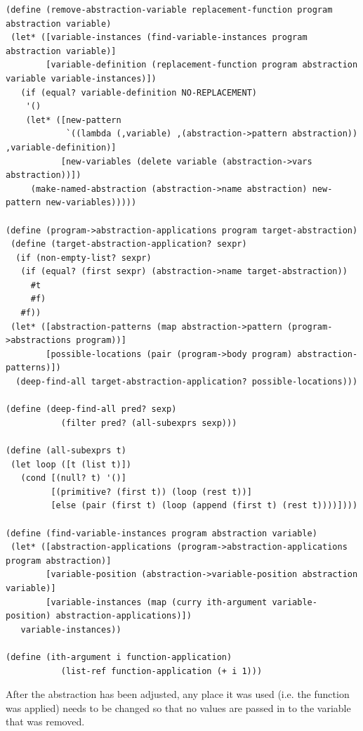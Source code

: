 \documentclass[a4paper,10pt]{article}
\begin{document}
\begin{lstlisting}[frame=trBL]
(define (remove-abstraction-variable replacement-function program abstraction variable)
 (let* ([variable-instances (find-variable-instances program abstraction variable)]
        [variable-definition (replacement-function program abstraction variable variable-instances)])
   (if (equal? variable-definition NO-REPLACEMENT)
    '()
    (let* ([new-pattern 
            `((lambda (,variable) ,(abstraction->pattern abstraction)) ,variable-definition)]
           [new-variables (delete variable (abstraction->vars abstraction))])
     (make-named-abstraction (abstraction->name abstraction) new-pattern new-variables)))))

(define (program->abstraction-applications program target-abstraction)
 (define (target-abstraction-application? sexpr)
  (if (non-empty-list? sexpr)
   (if (equal? (first sexpr) (abstraction->name target-abstraction))
     #t
     #f)
   #f))
 (let* ([abstraction-patterns (map abstraction->pattern (program->abstractions program))]
        [possible-locations (pair (program->body program) abstraction-patterns)])
  (deep-find-all target-abstraction-application? possible-locations)))

(define (deep-find-all pred? sexp)
           (filter pred? (all-subexprs sexp)))

(define (all-subexprs t)
 (let loop ([t (list t)])
   (cond [(null? t) '()]
         [(primitive? (first t)) (loop (rest t))]
         [else (pair (first t) (loop (append (first t) (rest t))))])))

(define (find-variable-instances program abstraction variable)
 (let* ([abstraction-applications (program->abstraction-applications program abstraction)]
        [variable-position (abstraction->variable-position abstraction variable)]
        [variable-instances (map (curry ith-argument variable-position) abstraction-applications)])
   variable-instances))

(define (ith-argument i function-application)
           (list-ref function-application (+ i 1)))
\end{lstlisting}
After the abstraction has been adjusted, any place it was used (i.e. the function was applied) needs to be changed so that no values are passed in to the variable that was removed.
\end{document}
